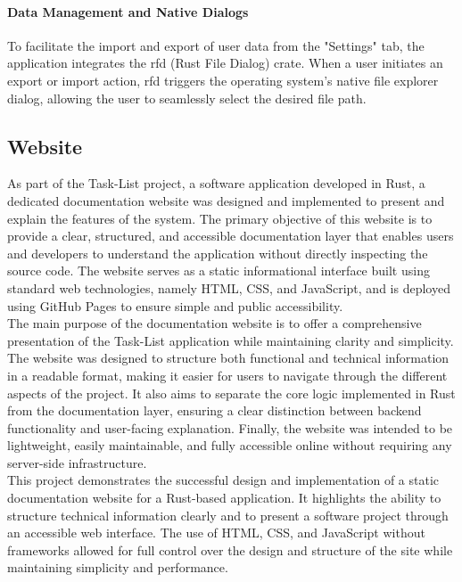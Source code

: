 \documentclass{article}
\begin{document}
\paragraph{Data Management and Native Dialogs}\hfill

To facilitate the import and export of user data from the "Settings" tab, the application integrates the rfd (Rust File Dialog) crate. When a user initiates an export or import action, rfd triggers the operating system's native file explorer dialog, allowing the user to seamlessly select the desired file path.



\subsection{Website}
As part of the Task-List project, a software application developed in Rust, a dedicated documentation website was designed and implemented to present and explain the features of the system. The primary objective of this website is to provide a clear, structured, and accessible documentation layer that enables users and developers to understand the application without directly inspecting the source code. The website serves as a static informational interface built using standard web technologies, namely HTML, CSS, and JavaScript, and is deployed using GitHub Pages to ensure simple and public accessibility.
\\

The main purpose of the documentation website is to offer a comprehensive presentation of the Task-List application while maintaining clarity and simplicity. The website was designed to structure both functional and technical information in a readable format, making it easier for users to navigate through the different aspects of the project. It also aims to separate the core logic implemented in Rust from the documentation layer, ensuring a clear distinction between backend functionality and user-facing explanation. Finally, the website was intended to be lightweight, easily maintainable, and fully accessible online without requiring any server-side infrastructure.
\\

This project demonstrates the successful design and implementation of a static documentation website for a Rust-based application. It highlights the ability to structure technical information clearly and to present a software project through an accessible web interface. The use of HTML, CSS, and JavaScript without frameworks allowed for full control over the design and structure of the site while maintaining simplicity and performance.
\\
\end{document}
